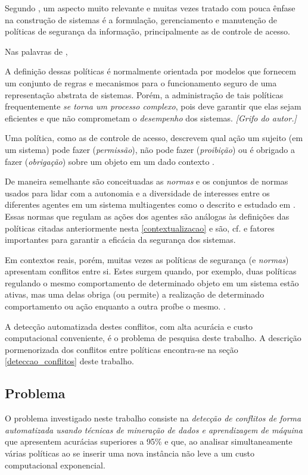 \documentclass[
	12pt,				%
	openright,			%
	twoside,			%
	a4paper,			%
	english,			%
	french,				%
	spanish,			%
	brazil				%
	]{abntex2}
\begin{document}
Segundo , um aspecto muito relevante e muitas vezes tratado com pouca ênfase na construção de sistemas é a formulação, gerenciamento e manutenção de políticas de segurança da informação, principalmente as de controle de acesso. 

Nas palavras de ,
\begin{citacao}
	A definição dessas políticas é normalmente orientada por modelos que fornecem um conjunto de regras e mecanismos para o funcionamento seguro de uma representação abstrata de sistemas. Porém, a administração de tais políticas frequentemente \textit{se torna um processo complexo}, pois deve garantir que elas sejam eficientes e que não comprometam o \textit{desempenho} dos sistemas. \emph{[Grifo do autor.]}
\end{citacao}

Uma política, como as de controle de acesso, descrevem qual ação um sujeito (em um sistema) pode fazer (\textit{permissão}), não pode fazer (\textit{proibição}) ou é obrigado a fazer (\textit{obrigação}) sobre um objeto em um dado contexto \cite{sarkis2017}. 

De maneira semelhante são conceituadas as \textit{normas} e os conjuntos de normas usados para lidar com a autonomia e a diversidade de interesses entre os diferentes agentes em um sistema multiagentes como o descrito e estudado em . Essas normas que regulam as ações dos agentes são análogas às definições das políticas citadas anteriormente nesta \autoref{contextualizacao} e são, cf.  e  fatores importantes para garantir a eficácia da segurança dos sistemas.

Em contextos reais, porém, muitas vezes as políticas de segurança (e \textit{normas}) apresentam conflitos entre si. Estes surgem quando, por exemplo, duas políticas regulando o mesmo comportamento de determinado objeto em um sistema estão ativas, mas uma delas obriga (ou permite) a realização de determinado comportamento ou ação enquanto a outra proíbe o mesmo. \cite{sarkis2017}\cite{eduardo2017}. 

A detecção automatizada destes conflitos, com alta acurácia e custo computacional conveniente, é o problema de pesquisa deste trabalho. A descrição pormenorizada dos conflitos entre políticas encontra-se na seção \ref{deteccao_conflitos} deste trabalho.
\subsection{Problema}\label{problema}
O problema investigado neste trabalho consiste na \textit{detecção de conflitos de forma automatizada usando técnicas de mineração de dados e aprendizagem de máquina} que apresentem acurácias superiores a 95\% e que, ao analisar simultaneamente várias políticas ao se inserir uma nova instância não leve a um custo computacional exponencial.
\end{document}
